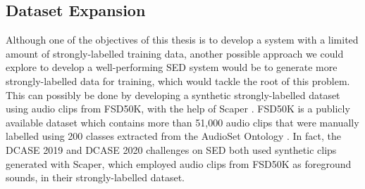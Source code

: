 \subsection{Dataset Expansion}
Although one of the objectives of this thesis is to develop a system with a limited amount of strongly-labelled training data, another possible approach we could explore to develop a well-performing SED system would be to generate more strongly-labelled data for training, which would tackle the root of this problem. This can possibly be done by developing a synthetic strongly-labelled dataset using audio clips from FSD50K, with the help of Scaper \cite{scaper2017}. FSD50K \cite{fonseca2020fsd50k} is a publicly available dataset which contains more than 51,000 audio clips that were manually labelled using 200 classes extracted from the AudioSet Ontology \cite{audioset}. In fact, the DCASE 2019 and DCASE 2020 \cite{DCASE2019} challenges on SED both used synthetic clips generated with Scaper, which employed audio clips from FSD50K as foreground sounds, in their strongly-labelled dataset.

\newpage
